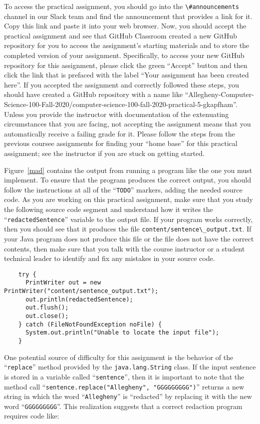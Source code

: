 \documentclass[11pt]{article}
\newcommand{\command}[1]{``\lstinline{#1}''}
\newcommand{\program}[1]{\lstinline{#1}}
\newcommand{\channel}[1]{\lstinline{#1}}
\begin{document}
To access the practical assignment, you should go into the
\channel{\#announcements} channel in our Slack team and find the announcement
that provides a link for it. Copy this link and paste it into your web browser.
Now, you should accept the practical assignment and see that GitHub Classroom
created a new GitHub repository for you to access the assignment's starting
materials and to store the completed version of your assignment. Specifically,
to access your new GitHub repository for this assignment, please click the green
``Accept'' button and then click the link that is prefaced with the label ``Your
assignment has been created here''. If you accepted the assignment and correctly
followed these steps, you should have created a GitHub repository with a name
like
``Allegheny-Computer-Science-100-Fall-2020/computer-science-100-fall-2020-practical-5-gkapfham''.
Unless you provide the instructor with documentation of the extenuating
circumstances that you are facing, not accepting the assignment means that you
automatically receive a failing grade for it. Please follow the steps from the
previous coursee assignments for finding your ``home base'' for this practical
assignment; see the instructor if you are stuck on getting started.

Figure~\ref{mad} contains the output from running a program like the one you
must implement. To ensure that the program produces the correct output, you
should follow the instructions at all of the \command{TODO} markers, adding the
needed source code. As you are working on this practical assignment, make sure
that you study the following source code segment and understand how it writes
the \command{redactedSentence} variable to the output file. If your program
works correctly, then you should see that it produces the file
\program{content/sentence\_output.txt}. If your Java program does not produce
this file or the file does not have the correct contents, then make sure that
you talk with the course instructor or a student technical leader to identify
and fix any mistakes in your source code.

\begin{verbatim}
    try {
      PrintWriter out = new PrintWriter("content/sentence_output.txt");
      out.println(redactedSentence);
      out.flush();
      out.close();
    } catch (FileNotFoundException noFile) {
      System.out.println("Unable to locate the input file");
    }
\end{verbatim}

One potential source of difficulty for this assignment is the behavior of the
\command{replace} method provided by the \program{java.lang.String} class. If
the input sentence is stored in a variable called \command{sentence}, then it is
important to note that the method call \command{sentence.replace("Allegheny",
"GGGGGGGGG")} returns a new string in which the word \command{Allegheny} is
``redacted'' by replacing it with the new word \command{GGGGGGGGG}. This
realization suggests that a correct redaction program requires code like:
\end{document}
